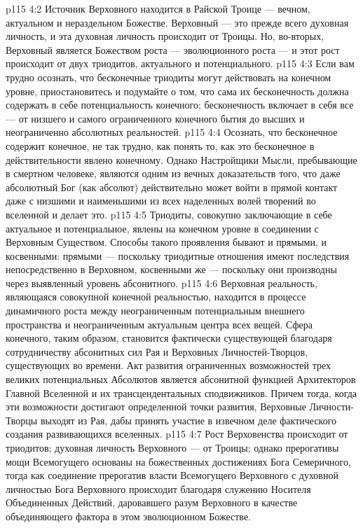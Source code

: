 \vs p115 4:2 Источник Верховного находится в Райской Троице --- вечном, актуальном и нераздельном Божестве. Верховный --- это прежде всего духовная личность, и эта духовная личность происходит от Троицы. Но, во\hyp{}вторых, Верховный является Божеством роста --- эволюционного роста --- и этот рост происходит от двух триодитов, актуального и потенциального.
\vs p115 4:3 Если вам трудно осознать, что бесконечные триодиты могут действовать на конечном уровне, приостановитесь и подумайте о том, что сама их бесконечность должна содержать в себе потенциальность конечного; бесконечность включает в себя все --- от низшего и самого ограниченного конечного бытия до высших и неограниченно абсолютных реальностей.
\vs p115 4:4 Осознать, что бесконечное содержит конечное, не так трудно, как понять то, как это бесконечное в действительности явлено конечному. Однако Настройщики Мысли, пребывающие в смертном человеке, являются одним из вечных доказательств того, что даже абсолютный Бог (как абсолют) действительно может войти в прямой контакт даже с низшими и наименьшими из всех наделенных волей творений во вселенной и делает это.
\vs p115 4:5 Триодиты, совокупно заключающие в себе актуальное и потенциальное, явлены на конечном уровне в соединении с Верховным Существом. Способы такого проявления бывают и прямыми, и косвенными: прямыми --- поскольку триодитные отношения имеют последствия непосредственно в Верховном, косвенными же --- поскольку они производны через выявленный уровень абсонитного.
\vs p115 4:6 Верховная реальность, являющаяся совокупной конечной реальностью, находится в процессе динамичного роста между неограниченным потенциальным внешнего пространства и неограниченным актуальным центра всех вещей. Сфера конечного, таким образом, становится фактически существующей благодаря сотрудничеству абсонитных сил Рая и Верховных Личностей\hyp{}Творцов, существующих во времени. Акт развития ограниченных возможностей трех великих потенциальных Абсолютов является абсонитной функцией Архитекторов Главной Вселенной и их трансцендентальных сподвижников. Причем тогда, когда эти возможности достигают определенной точки развития, Верховные Личности\hyp{}Творцы выходят из Рая, дабы принять участие в извечном деле фактического создания развивающихся вселенных.
\vs p115 4:7 Рост Верховенства происходит от триодитов; духовная личность Верховного --- от Троицы; однако прерогативы мощи Всемогущего основаны на божественных достижениях Бога Семеричного, тогда как соединение прерогатив власти Всемогущего Верховного с духовной личностью Бога Верховного происходит благодаря служению Носителя Объединенных Действий, даровавшего разум Верховного в качестве объединяющего фактора в этом эволюционном Божестве.
